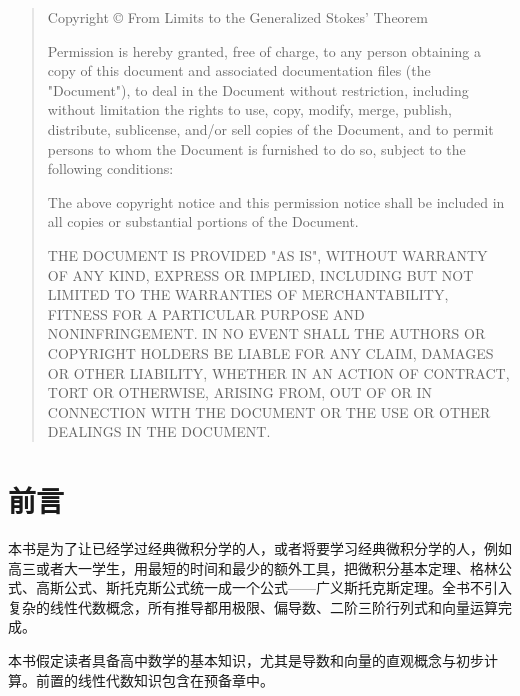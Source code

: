 \begin{quote}\footnotesize
	\thispagestyle{empty}
		Copyright \copyright{} {\the\year} From Limits to the Generalized Stokes' Theorem

		Permission is hereby granted, free of charge, to any person obtaining a copy of this document and associated documentation files (the "Document"), to deal in the Document without restriction, including without limitation the rights to use, copy, modify, merge, publish, distribute, sublicense, and/or sell copies of the Document, and to permit persons to whom the Document is furnished to do so, subject to the following conditions:

		\vspace{1ex}
		The above copyright notice and this permission notice shall be included in all copies or substantial portions of the Document.
		\vspace{1ex}

		THE DOCUMENT IS PROVIDED "AS IS", WITHOUT WARRANTY OF ANY KIND, EXPRESS OR IMPLIED, INCLUDING BUT NOT LIMITED TO THE WARRANTIES OF MERCHANTABILITY, FITNESS FOR A PARTICULAR PURPOSE AND NONINFRINGEMENT. IN NO EVENT SHALL THE AUTHORS OR COPYRIGHT HOLDERS BE LIABLE FOR ANY CLAIM, DAMAGES OR OTHER LIABILITY, WHETHER IN AN ACTION OF CONTRACT, TORT OR OTHERWISE, ARISING FROM, OUT OF OR IN CONNECTION WITH THE DOCUMENT OR THE USE OR OTHER DEALINGS IN THE DOCUMENT.
	\end{quote}


\newpage
\pagestyle{fancy}
\fancyhf{}
\setlength{\headheight}{14pt}
\fancyhead[RE,LO]{\color{titleblue!70}\leftmark}
\fancyfoot[C]{\thepage}
\renewcommand{\headrulewidth}{0.4pt}
\renewcommand{\headrule}{\hrule width\headwidth height\headrulewidth \vskip-2pt {\color{gold}\hrule width\headwidth height 0.5pt}}


\frontmatter
\chapter{前言}

本书是为了让已经学过经典微积分学的人，或者将要学习经典微积分学的人，例如高三或者大一学生，用最短的时间和最少的额外工具，把微积分基本定理、格林公式、高斯公式、斯托克斯公式统一成一个公式——广义斯托克斯定理。全书不引入复杂的线性代数概念，所有推导都用极限、偏导数、二阶三阶行列式和向量运算完成。

本书假定读者具备高中数学的基本知识，尤其是导数和向量的直观概念与初步计算。前置的线性代数知识包含在预备章中。

